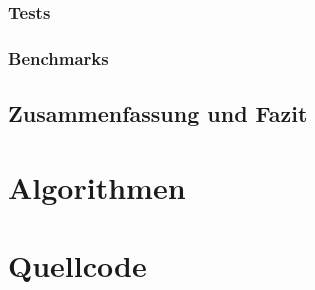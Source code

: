 \documentclass[a4paper,12pt,oneside,german,toc=bibliography]{scrbook}
\theoremstyle{definition}
\theoremstyle{plain}
\numberwithin{equation}{section}
\begin{document}
\subsection{Tests}     
\subsection{Benchmarks}


\section{Zusammenfassung und Fazit}




\appendix


\chapter{Algorithmen}






\chapter{Quellcode}






\end{document}
